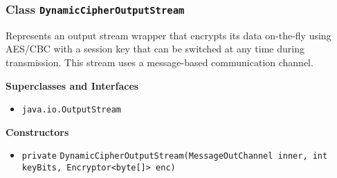 \subsubsection{Class \lstinline|DynamicCipherOutputStream|}
Represents an output stream wrapper that encrypts its data on-the-fly using
 AES/CBC with a session key that can be switched at any time during
 transmission.
 This stream uses a message-based communication channel. \\
\noindent\begin{minipage}[t]{5cm}
\vspace{0.3em}
\hspace*{2em}
\vspace{0.3em}
\end{minipage}



\textbf{\sffamily Superclasses and Interfaces}
\begin{itemize}
\item \lstinline|java.io.OutputStream|
\end{itemize}


\textbf{\sffamily Constructors}
\begin{itemize}
\item \lstinline|private| \lstinline|DynamicCipherOutputStream|\lstinline|(MessageOutChannel inner, int keyBits, Encryptor<byte[]> enc)| \\[-0.6em]




\end{itemize}


